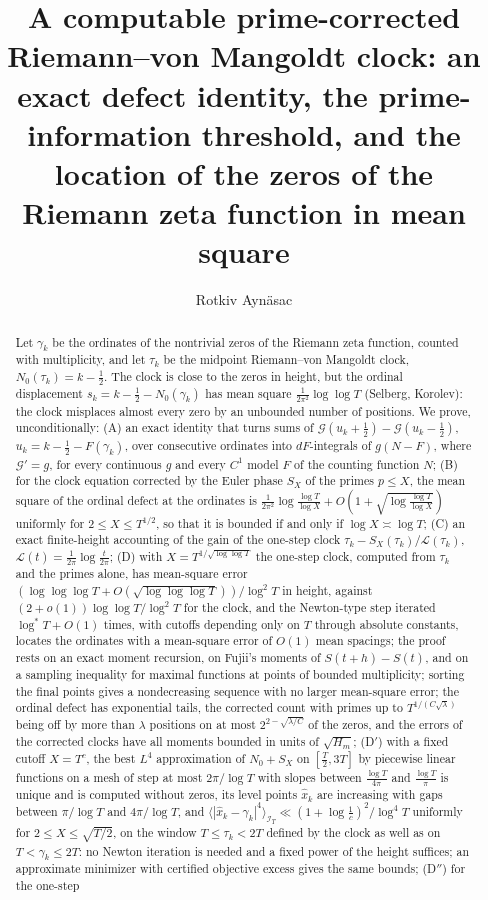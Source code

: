 \documentclass[preprint,12pt]{elsarticle}
\numberwithin{equation}{section}
\theoremstyle{plain}
\theoremstyle{definition}
\theoremstyle{remark}
\newcommand{\NO}{N_0}
\newcommand{\lL}{\mathcal L}
\newcommand{\IT}{\mathcal I_T}
\begin{document}
\begin{frontmatter}
\title{A computable prime-corrected Riemann--von Mangoldt clock: an exact defect identity, the prime-information threshold, and the location of the zeros of the Riemann zeta function in mean square}
\author{Rotkiv Ayn\"asac}

\begin{abstract}
Let $\gamma_k$ be the ordinates of the nontrivial zeros of the Riemann zeta function, counted with multiplicity, and let $\tau_k$ be the midpoint Riemann--von Mangoldt clock, $\NO(\tau_k)=k-\frac12$. The clock is close to the zeros in height, but the ordinal displacement $s_k=k-\frac12-\NO(\gamma_k)$ has mean square $\frac1{2\pi^2}\log\log T$ (Selberg, Korolev): the clock misplaces almost every zero by an unbounded number of positions. We prove, unconditionally: (A) an exact identity that turns sums of $\mathcal G(u_k+\frac12)-\mathcal G(u_k-\frac12)$, $u_k=k-\frac12-F(\gamma_k)$, over consecutive ordinates into $dF$-integrals of $g(N-F)$, where $\mathcal G'=g$, for every continuous $g$ and every $C^1$ model $F$ of the counting function $N$; (B) for the clock equation corrected by the Euler phase $S_X$ of the primes $p\le X$, the mean square of the ordinal defect at the ordinates is $\frac1{2\pi^2}\log\frac{\log T}{\log X}+O(1+\sqrt{\log\frac{\log T}{\log X}})$ uniformly for $2\le X\le T^{1/2}$, so that it is bounded if and only if $\log X\asymp\log T$; (C) an exact finite-height accounting of the gain of the one-step clock $\tau_k-S_X(\tau_k)/\lL(\tau_k)$, $\lL(t)=\frac1{2\pi}\log\frac t{2\pi}$; (D) with $X=T^{1/\sqrt{\log\log T}}$ the one-step clock, computed from $\tau_k$ and the primes alone, has mean-square error $(\log\log\log T+O(\sqrt{\log\log\log T}))/\log^2T$ in height, against $(2+o(1))\log\log T/\log^2T$ for the clock, and the Newton-type step iterated $\log^*T+O(1)$ times, with cutoffs depending only on $T$ through absolute constants, locates the ordinates with a mean-square error of $O(1)$ mean spacings; the proof rests on an exact moment recursion, on Fujii's moments of $S(t+h)-S(t)$, and on a sampling inequality for maximal functions at points of bounded multiplicity; sorting the final points gives a nondecreasing sequence with no larger mean-square error; the ordinal defect has exponential tails, the corrected count with primes up to $T^{1/(C\sqrt\lambda)}$ being off by more than $\lambda$ positions on at most $2^{2-\sqrt{\lambda/C}}$ of the zeros, and the errors of the corrected clocks have all moments bounded in units of $\sqrt{H_m}$; (D$'$) with a fixed cutoff $X=T^c$, the best $L^4$ approximation of $\NO+S_X$ on $[\frac T2,3T]$ by piecewise linear functions on a mesh of step at most $2\pi/\log T$ with slopes between $\frac{\log T}{4\pi}$ and $\frac{\log T}\pi$ is unique and is computed without zeros, its level points $\widehat x_k$ are increasing with gaps between $\pi/\log T$ and $4\pi/\log T$, and $\langle|\widehat x_k-\gamma_k|^4\rangle_{\IT}\ll(1+\log\frac1c)^2/\log^4T$ uniformly for $2\le X\le\sqrt{T/2}$, on the window $T\le\tau_k<2T$ defined by the clock as well as on $T<\gamma_k\le2T$: no Newton iteration is needed and a fixed power of the height suffices; an approximate minimizer with certified objective excess gives the same bounds; (D$''$) for the one-step 
\end{abstract}
\end{frontmatter}
\end{document}
